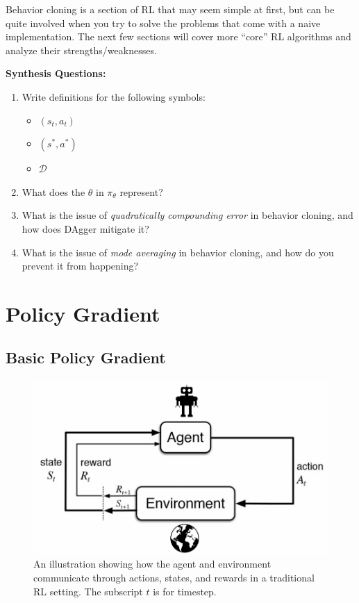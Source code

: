     Behavior cloning is a section of RL that may seem simple at first, but can be quite involved when you try to solve the problems that come with a naive implementation. The next few sections will cover more ``core'' RL algorithms and analyze their strengths/weaknesses.

\begin{questionbox}
\textbf{Synthesis Questions:}
\begin{enumerate}
    \item Write definitions for the following symbols:
    \begin{itemize}
        \item $(s_t, a_t)$
        \item $(s^\ast, a^\ast)$
        \item $\mathcal{D}$
    \end{itemize}
    \item What does the $\theta$ in $\pi_\theta$ represent?
    \item What is the issue of \textit{quadratically compounding error} in behavior cloning, and how does DAgger mitigate it?
    \item What is the issue of \textit{mode averaging} in behavior cloning, and how do you prevent it from happening?
\end{enumerate}
\end{questionbox}


\section{Policy Gradient}
\subsection{Basic Policy Gradient}

    \begin{figure}[H]
            \centering
            \includegraphics[width=0.7\linewidth]{rl/rlsystem.png}
            \caption{An illustration showing how the agent and environment communicate through actions, states, and rewards in a traditional RL setting. The subscript $t$ is for timestep.}
            \label{fig:rlsystem}
    \end{figure}
    
